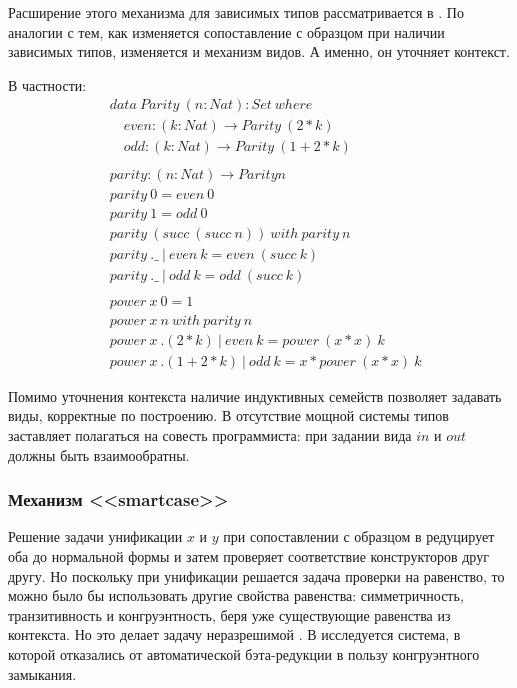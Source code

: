 Расширение этого механизма для зависимых типов рассматривается в
\cite{the-view-from-the-left}. По аналогии с тем, как
изменяется сопоставление с образцом при наличии зависимых типов,
изменяется и механизм видов. А именно, он уточняет контекст.

В частности:
\begin{align*}
&data\ Parity\ (n : Nat) : Set\ where\\
&\quad even : (k : Nat) \to Parity\ (2 * k)\\
&\quad odd : (k : Nat) \to Parity\ (1 + 2 * k)\\
\\
&parity : (n : Nat) \to Parity n\\
&parity\ 0 = even\ 0\\
&parity\ 1 = odd\ 0\\
&parity\ (succ\ (succ\ n))\ with\ parity\ n\\
&parity\ .\_\ |\ even\ k = even\ (succ\ k)\\
&parity\ .\_\ |\ odd\ k = odd\ (succ\ k)\\
\\
&power\ x\ 0 = 1\\
&power\ x\ n\ with\ parity\ n\\
&power\ x\ .(2 * k)\ |\ even\ k = power\ (x * x)\ k\\
&power\ x\ .(1 + 2 * k)\ |\ odd\ k = x * power\ (x * x)\ k
\end{align*}

Помимо уточнения контекста наличие индуктивных семейств позволяет
задавать виды, корректные по построению. В \cite{views} отсутствие
мощной системы типов заставляет полагаться на совесть программиста:
при задании вида \(in\) и \(out\) должны быть взаимообратны.

\subsubsection{Механизм <<smartcase>>}

Решение задачи унификации \(x\) и \(y\) при сопоставлении с образцом в
\cite{dependent-pattern-matching} редуцирует оба до нормальной формы и затем
проверяет соответствие конструкторов друг другу. Но поскольку при унификации
решается задача проверки на равенство, то можно было бы использовать другие
свойства равенства: симметричность, транзитивность и конгруэнтность, беря уже
существующие равенства из контекста. Но это делает задачу неразрешимой
\cite{programming-up-to-congruence}. В \cite{programming-up-to-congruence}
исследуется система, в которой отказались от автоматической бэта-редукции в
пользу конгруэнтного замыкания.

